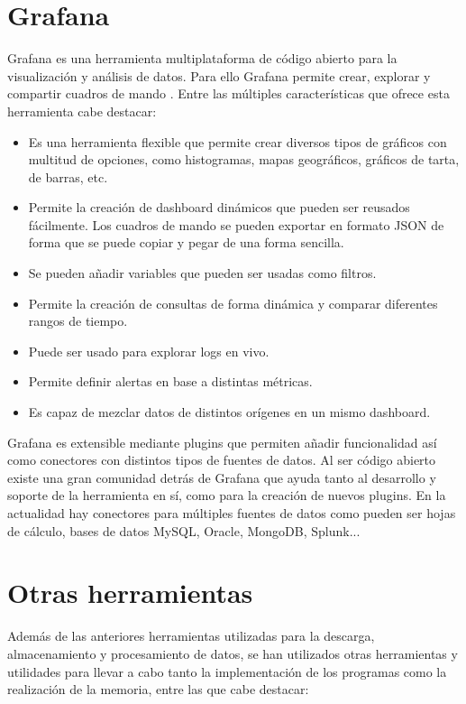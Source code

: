 \section{Grafana}

Grafana es una herramienta multiplataforma de código abierto para la visualización y análisis de datos. Para ello Grafana permite crear, explorar y compartir cuadros de mando \cite{wiki_grafana}\cite{github_grafana}. Entre las múltiples características que ofrece esta herramienta cabe destacar:

\begin{itemize}
    \item Es una herramienta flexible que permite crear diversos tipos de gráficos con multitud de opciones, como histogramas, mapas geográficos, gráficos de tarta, de barras, etc.
    \item Permite la creación de dashboard dinámicos que pueden ser reusados fácilmente. Los cuadros de mando se pueden exportar en formato JSON de forma que se puede copiar y pegar de una forma sencilla.
    \item Se pueden añadir variables que pueden ser usadas como filtros.
    \item Permite la creación de consultas de forma dinámica y comparar diferentes rangos de tiempo.
    \item Puede ser usado para explorar logs en vivo.
    \item Permite definir alertas en base a distintas métricas.
    \item Es capaz de mezclar datos de distintos orígenes en un mismo dashboard.
\end{itemize}

Grafana es extensible mediante plugins que permiten añadir funcionalidad así como conectores con distintos tipos de fuentes de datos. Al ser código abierto existe una gran comunidad detrás de Grafana que ayuda tanto al desarrollo y soporte de la herramienta en sí, como para la creación de nuevos plugins. En la actualidad hay conectores para múltiples fuentes de datos como pueden ser hojas de cálculo, bases de datos MySQL, Oracle, MongoDB, Splunk...

\section{Otras herramientas}
\label{sect:otras_herramientas}

Además de las anteriores herramientas utilizadas para la descarga, almacenamiento y procesamiento de datos, se han utilizados otras herramientas y utilidades para llevar a cabo tanto la implementación de los programas como la realización de la memoria, entre las que cabe destacar:

